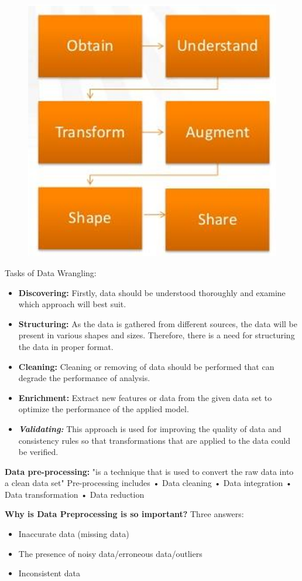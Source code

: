 \documentclass{report}
\begin{document}
\begin{figure}[H]
    \centering
    \includegraphics[width=0.6\linewidth]{images/data wrangling.png}
\end{figure}

\noindent Tasks of Data Wrangling:
\begin{itemize}
    \item \textbf{Discovering:} Firstly, data should be understood thoroughly and examine which approach will best suit. 
    \item \textbf{Structuring:} As the data is gathered from different sources, the data will be present in various shapes and sizes. Therefore, there is a need for structuring the data in proper format.
    \item \textbf{Cleaning:} Cleaning or removing of data should be performed that can degrade the performance of analysis.
    \item \textbf{Enrichment:} Extract new features or data from the given data set to optimize the performance of the applied model.
    \item \textbf{\textit{Validating:}} This approach is used for improving the quality of data and consistency rules so that transformations that are applied to the data could be verified.
\end{itemize}

\noindent \textbf{Data pre-processing:} "is a technique that is used to convert the raw data into a clean data set"
\noindent Pre-processing includes • Data cleaning • Data integration • Data transformation • Data reduction

\noindent \textbf{Why is Data Preprocessing is so important?}
\noindent Three answers:
\begin{itemize}
    \item Inaccurate data (missing data) 
    \item The presence of noisy data/erroneous data/outliers
    \item Inconsistent data 
\end{itemize}
\end{document}
